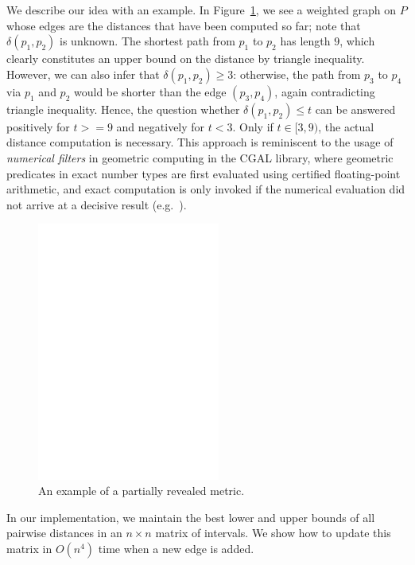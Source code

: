 \documentclass[10pt]{article}
\newcommand{\dist}{\delta}
\newcommand{\complexity}{C_{\dist}}
\begin{document}
We describe our idea with an example. In Figure~\ref{fig:1st_example},
we see a weighted graph on $P$ whose edges are the distances that have
been computed so far; note that $\dist(p_1,p_2)$ is unknown. 
The shortest path from $p_1$ to $p_2$ has length $9$, which clearly
constitutes an upper bound on the distance by triangle inequality.
However, we can also infer that $\dist(p_1,p_2)\geq 3$:
otherwise, the path from $p_3$ to $p_4$ via $p_1$ and $p_2$
would be shorter than the edge $(p_3,p_4)$, again contradicting
triangle inequality.
Hence, the question whether $\dist(p_1,p_2)\leq t$ can be answered positively
for $t>=9$ and negatively for $t<3$. Only if $t\in[3,9)$, the actual
distance computation is necessary. This approach is reminiscent to the usage
of \emph{numerical filters} in geometric computing in the CGAL library,
where geometric predicates in exact number types are first evaluated using 
certified floating-point arithmetic, and exact computation is only
invoked if the numerical evaluation did not arrive at a decisive result
(e.g.~\cite{bbp-interval,kerber-phd}).

\begin{figure}[h]

\centering
\includegraphics[width=6cm]{intro_example.eps}
\caption{An example of a partially revealed metric.}
\label{fig:1st_example}
\end{figure}

In our implementation, we maintain the best lower and upper bounds of all
pairwise distances in an $n\times n$ matrix of intervals. We show how to
update this matrix in $O(n^4)$ time when a new edge is added.
\end{document}
